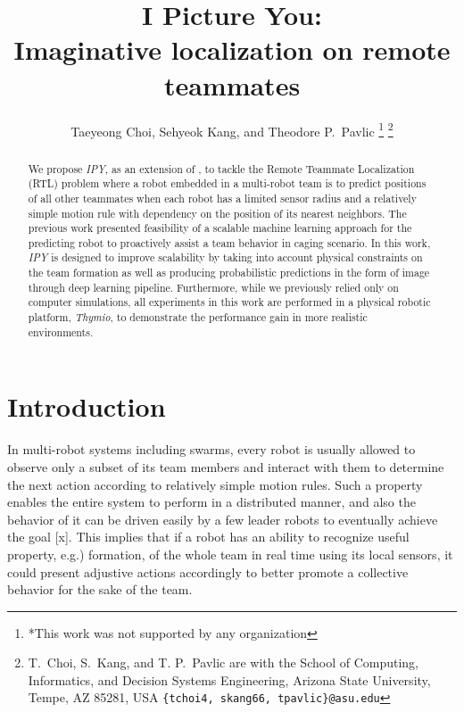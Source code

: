 \documentclass[letterpaper, 10 pt, conference]{ieeeconf}  %
\title{\LARGE \bf
	I Picture You: \\
	Imaginative localization on remote teammates
}
\author{Taeyeong Choi, Sehyeok Kang, and Theodore P.~Pavlic %
	\thanks{*This work was not supported by any organization}%
	\thanks{T.~Choi, S.~Kang, and T. P.~Pavlic are with the School of Computing, Informatics, and Decision Systems Engineering,
		Arizona State University, Tempe, AZ 85281, USA
		{\tt\small \{tchoi4, skang66, tpavlic\}@asu.edu}}%
}
\begin{document}
	
	
	
	\maketitle
	\thispagestyle{empty}
	\pagestyle{empty}
	
	
	\begin{abstract}
		
		We propose \emph{IPY}, as an extension of \cite{Choi17}, to tackle the Remote Teammate 
		Localization (RTL) problem where a robot embedded in a multi-robot team is to predict positions 
		of all other teammates when each robot has a limited sensor radius and a 
		relatively simple motion rule with dependency on the position of its nearest neighbors. 
		The previous work presented feasibility of a scalable machine learning approach for the 
		predicting robot to proactively assist a team behavior in caging scenario. 
		In this work, \emph{IPY} is designed to improve scalability by taking into account
		physical constraints on the team formation as well as producing probabilistic predictions  
		in the form of image through deep learning pipeline.
		Furthermore, while we previously relied only on computer simulations, 
		all experiments in this work are performed in a physical robotic platform, \emph{Thymio}, 
		to demonstrate the performance gain in more realistic environments. 
		
	\end{abstract}
	
	
	
	\section{Introduction}
	\label{sec:intro}
	
	In multi-robot systems including swarms, every robot is usually allowed to observe 
	only a subset of its team members and interact with them to determine the next action 
	according to relatively simple motion rules. 
	Such a property enables the entire system to perform in a distributed manner, and 
	also the behavior of it can be driven easily by a few leader robots to 
	eventually achieve the goal [x]. 
	This implies that if a robot has an ability to recognize useful property, e.g.) formation, 
	of the whole team in real time using its local sensors, 
	it could present adjustive actions accordingly to better promote a collective behavior 
	for the sake of the team.
	
\end{document}
